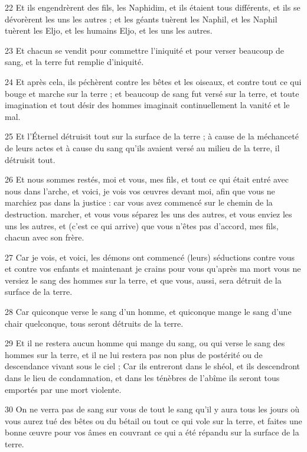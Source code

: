 \par 22 Et ils engendrèrent des fils, les Naphidim, et ils étaient tous différents, et ils se dévorèrent les uns les autres ; et les géants tuèrent les Naphil, et les Naphil tuèrent les Eljo, et les humains Eljo, et les uns les autres.
\par 23 Et chacun se vendit pour commettre l'iniquité et pour verser beaucoup de sang, et la terre fut remplie d'iniquité.
\par 24 Et après cela, ils péchèrent contre les bêtes et les oiseaux, et contre tout ce qui bouge et marche sur la terre ; et beaucoup de sang fut versé sur la terre, et toute imagination et tout désir des hommes imaginait continuellement la vanité et le mal.
\par 25 Et l'Éternel détruisit tout sur la surface de la terre ; à cause de la méchanceté de leurs actes et à cause du sang qu'ils avaient versé au milieu de la terre, il détruisit tout.
\par 26 Et nous sommes restés, moi et vous, mes fils, et tout ce qui était entré avec nous dans l'arche, et voici, je vois vos œuvres devant moi, afin que vous ne marchiez pas dans la justice : car vous avez commencé sur le chemin de la destruction. marcher, et vous vous séparez les uns des autres, et vous enviez les uns les autres, et (c'est ce qui arrive) que vous n'êtes pas d'accord, mes fils, chacun avec son frère.
\par 27 Car je vois, et voici, les démons ont commencé (leurs) séductions contre vous et contre vos enfants et maintenant je crains pour vous qu'après ma mort vous ne versiez le sang des hommes sur la terre, et que vous, aussi, sera détruit de la surface de la terre.
\par 28 Car quiconque verse le sang d'un homme, et quiconque mange le sang d'une chair quelconque, tous seront détruits de la terre.
\par 29 Et il ne restera aucun homme qui mange du sang, ou qui verse le sang des hommes sur la terre, et il ne lui restera pas non plus de postérité ou de descendance vivant sous le ciel ; Car ils entreront dans le shéol, et ils descendront dans le lieu de condamnation, et dans les ténèbres de l'abîme ils seront tous emportés par une mort violente.
\par 30 On ne verra pas de sang sur vous de tout le sang qu'il y aura tous les jours où vous aurez tué des bêtes ou du bétail ou tout ce qui vole sur la terre, et faites une bonne œuvre pour vos âmes en couvrant ce qui a été répandu sur la surface de la terre.
